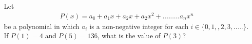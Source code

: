 \item Let
\begin{align*}
P(x) = a_0 + a_1x + a_2x + a_2x^2+.........a_nx^n
\end{align*}
be a polynomial in which $a_i$ is a non-negative integer for each $i \in \{0, 1,, 2, 3,.....\}$. If $P(1) = 4$  and $P(5) = 136$, what is the value of $P(3)$?
































